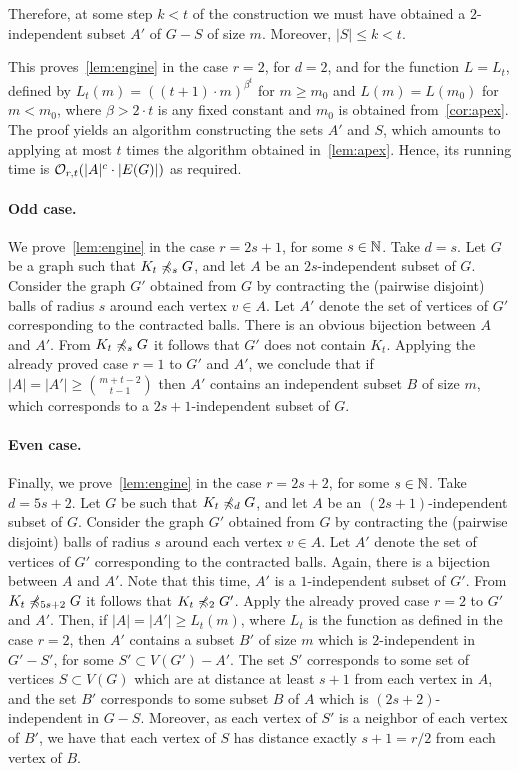  Therefore, at some step $k<t$ of the construction we must have obtained a $2$-independent subset $A'$ of $G-S$ of size $m$. Moreover, $|S|\le k<t$.
 
 
 
 This proves~\cref{lem:engine} in the case $r=2$, for $d=2$, and for the function $L=L_t$, defined by $L_t(m)=((t+1)\cdot m)^{\beta^t}$
 for $m\ge m_0$ and $L(m)=L(m_0)$ for $m<m_0$, where $\beta>2\cdot t$ is any fixed constant and $m_0$ is obtained from~\cref{cor:apex}.
 The proof yields an algorithm constructing the sets $A'$ and $S$,
 which amounts to applying at most $t$ times the algorithm obtained in~\cref{lem:apex}.
 Hence, its running time  is $\mathcal{O}_{r,t}(|A|^c\cdot |E(G)|)$ as required.


\paragraph{Odd case.}
We prove~\cref{lem:engine} in the case $r=2s+1$, for some $s\in \mathbb{N}$. Take $d=s$.
Let $G$ be a graph such that $K_t\not\preccurlyeq_s G$, and 
 let $A$ be an $2s$-independent subset of $G$. Consider the graph $G'$ obtained from $G$
by contracting the (pairwise disjoint) balls of radius $s$ around each vertex $v\in A$.
 Let $A'$ denote the set of vertices of $G'$ corresponding to the contracted balls. There is an obvious bijection between $A$ and $A'$.
From $K_t\not\preccurlyeq_s G$ it follows that $G'$ does not contain $K_t$. Applying the already proved case $r=1$ to $G'$ and $A'$, we conclude that 
if $|A|=|A'|\ge {m+t-2\choose t-1}$ then
 $A'$ contains an independent subset $B$ of size $m$,
 which corresponds to a $2s+1$-independent subset of $G$.
 
 
 \paragraph{Even case.}
 Finally,
 we prove~\cref{lem:engine} in the case $r=2s+2$, for some $s\in \mathbb{N}$.  Take  $d=5s+2$.
Let $G$  be such that 
 $K_t\not\preccurlyeq_{d} G$, and
let $A$ be an $(2s+1)$-independent subset of $G$. Consider the graph $G'$ obtained from $G$
by contracting the (pairwise disjoint) balls of radius $s$ around each vertex $v\in A$.
 Let $A'$ denote the set of vertices of $G'$ corresponding to the contracted balls. Again, there is a bijection between $A$ and $A'$. Note that
this time, $A'$ is a $1$-independent subset of $G'$.
From $K_t\not\preccurlyeq_{5s+2} G$ it follows that $K_t\not\preccurlyeq_2 G'$. Apply the already proved case $r=2$ to $G'$ and $A'$. Then, if $|A|=|A'|\ge L_t(m)$, where $L_t$ is the function as defined in the case $r=2$, then
 $A'$ contains a subset $B'$ of size $m$
which is  $2$-independent in $G'-S'$, for some $S'\subset V(G')-A'$.
The set $S'$ corresponds to some set of vertices $S\subset V(G)$
which are at distance at least $s+1$ from each vertex in $A$,
and the set  $B'$ corresponds to some subset $B$ of $A$
which is $(2s+2)$-independent in $G-S$. Moreover, as each vertex of $S'$
is a neighbor of each vertex of $B'$, we have that each vertex of $S$
has distance exactly $s+1=r/2$ from each vertex of $B$.

